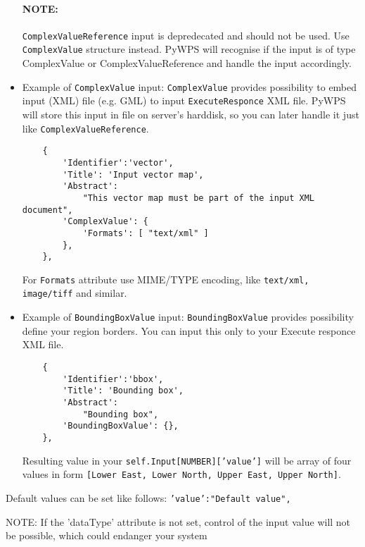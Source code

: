 \documentclass[a4paper,11pt]{article}
\begin{document}
\begin{itemize}
        \paragraph{NOTE:} \texttt{ComplexValueReference} input is depredecated and
        should not be used. Use \texttt{ComplexValue} structure instead.
        PyWPS will recognise if the input is of type ComplexValue or
        ComplexValueReference and handle the input accordingly.
     

        \item Example of \texttt{ComplexValue} input:
        \texttt{ComplexValue} provides possibility to embed input (XML)
        file (e.g. GML) to input \texttt{ExecuteResponce} XML file. PyWPS
        will store this input in file on server's harddisk, so you can
        later handle it just like \texttt{ComplexValueReference}.

    \begin{verbatim}
    {
        'Identifier':'vector',
        'Title': 'Input vector map',
        'Abstract':
            "This vector map must be part of the input XML document",
        'ComplexValue': {
            'Formats': [ "text/xml" ]
        },
    },
    \end{verbatim}

    For \texttt{Formats} attribute use MIME/TYPE encoding, like
    \texttt{text/xml, image/tiff} and similar.

        \item Example of \texttt{BoundingBoxValue} input:
        \texttt{BoundingBoxValue} provides possibility define your region
        borders. You can input this only to your Execute responce XML file.

    \begin{verbatim}
    {
        'Identifier':'bbox',
        'Title': 'Bounding box',
        'Abstract':
            "Bounding box",
        'BoundingBoxValue': {},
    },
    \end{verbatim}

    Resulting value in your \texttt{self.Input[NUMBER]['value']} will be
    array of four values in form \texttt{[Lower East, Lower North, Upper
    East, Upper North]}.
         
    \end{itemize}


     
    Default values can be set like follows: \texttt{'value':"Default value",}

    NOTE: If the 'dataType' attribute is not set, control of the input value
    will not be possible, which could endanger your system
     
\end{document}
